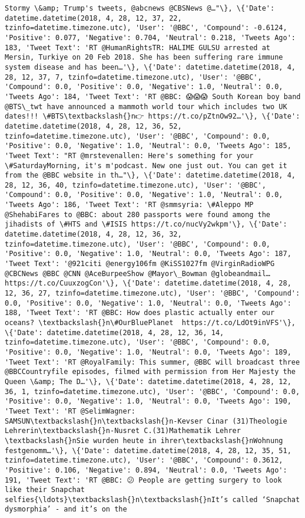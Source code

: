 \documentclass[11pt]{article}
\begin{document}
\begin{Verbatim}[commandchars=\\\{\}]
Stormy \&amp; Trump's tweets, @abcnews @CBSNews @…"\}, \{'Date': datetime.datetime(2018, 4, 28, 12, 37, 22, tzinfo=datetime.timezone.utc), 'User': '@BBC', 'Compound': -0.6124, 'Positive': 0.077, 'Negative': 0.704, 'Neutral': 0.218, 'Tweets Ago': 183, 'Tweet Text': 'RT @HumanRightsTR: HALIME GULSU arrested at Mersin, Turkiye on 20 Feb 2018. She has been suffering rare immune system disease and has been…'\}, \{'Date': datetime.datetime(2018, 4, 28, 12, 37, 7, tzinfo=datetime.timezone.utc), 'User': '@BBC', 'Compound': 0.0, 'Positive': 0.0, 'Negative': 1.0, 'Neutral': 0.0, 'Tweets Ago': 184, 'Tweet Text': 'RT @BBC: 😱😱😱 South Korean boy band @BTS\_twt have announced a mammoth world tour which includes two UK dates!!! \#BTS\textbackslash{}n👉 https://t.co/pZtnOw92…'\}, \{'Date': datetime.datetime(2018, 4, 28, 12, 36, 52, tzinfo=datetime.timezone.utc), 'User': '@BBC', 'Compound': 0.0, 'Positive': 0.0, 'Negative': 1.0, 'Neutral': 0.0, 'Tweets Ago': 185, 'Tweet Text': "RT @mrstevenallen: Here's something for your \#SaturdayMorning, it's m'podcast. New one just out. You can get it from the @BBC website in th…"\}, \{'Date': datetime.datetime(2018, 4, 28, 12, 36, 40, tzinfo=datetime.timezone.utc), 'User': '@BBC', 'Compound': 0.0, 'Positive': 0.0, 'Negative': 1.0, 'Neutral': 0.0, 'Tweets Ago': 186, 'Tweet Text': 'RT @smmsyria: \#Aleppo MP @ShehabiFares to @BBC: about 280 passports were found among the jihadists of \#HTS and \#ISIS https://t.co/nucVy2wkpm'\}, \{'Date': datetime.datetime(2018, 4, 28, 12, 36, 32, tzinfo=datetime.timezone.utc), 'User': '@BBC', 'Compound': 0.0, 'Positive': 0.0, 'Negative': 1.0, 'Neutral': 0.0, 'Tweets Ago': 187, 'Tweet Text': '@921citi @energy106fm @KiSS1027fm @VirginRadioWPG @CBCNews @BBC @CNN @AceBurpeeShow @Mayor\_Bowman @globeandmail… https://t.co/CuuxzogCon'\}, \{'Date': datetime.datetime(2018, 4, 28, 12, 36, 27, tzinfo=datetime.timezone.utc), 'User': '@BBC', 'Compound': 0.0, 'Positive': 0.0, 'Negative': 1.0, 'Neutral': 0.0, 'Tweets Ago': 188, 'Tweet Text': 'RT @BBC: How does plastic actually enter our oceans? \textbackslash{}n\#OurBluePlanet  https://t.co/LdOt9inVFS'\}, \{'Date': datetime.datetime(2018, 4, 28, 12, 36, 14, tzinfo=datetime.timezone.utc), 'User': '@BBC', 'Compound': 0.0, 'Positive': 0.0, 'Negative': 1.0, 'Neutral': 0.0, 'Tweets Ago': 189, 'Tweet Text': 'RT @RoyalFamily: This summer, @BBC will broadcast three @BBCCountryfile episodes, filmed with permission from Her Majesty the Queen \&amp; The D…'\}, \{'Date': datetime.datetime(2018, 4, 28, 12, 36, 1, tzinfo=datetime.timezone.utc), 'User': '@BBC', 'Compound': 0.0, 'Positive': 0.0, 'Negative': 1.0, 'Neutral': 0.0, 'Tweets Ago': 190, 'Tweet Text': 'RT @SelimWagner: SAMSUN\textbackslash{}n\textbackslash{}n-Kevser Cinar (31)Theologie Lehrerin\textbackslash{}n-Nusret C.(31)Mathematik Lehrer \textbackslash{}nSie wurden heute in ihrer\textbackslash{}nWohnung festgenomm…'\}, \{'Date': datetime.datetime(2018, 4, 28, 12, 35, 51, tzinfo=datetime.timezone.utc), 'User': '@BBC', 'Compound': 0.3612, 'Positive': 0.106, 'Negative': 0.894, 'Neutral': 0.0, 'Tweets Ago': 191, 'Tweet Text': 'RT @BBC: 😕 People are getting surgery to look like their Snapchat selfies{\ldots}\textbackslash{}n\textbackslash{}nIt’s called ‘Snapchat dysmorphia’ - and it’s on the 
\end{Verbatim}
\end{document}
